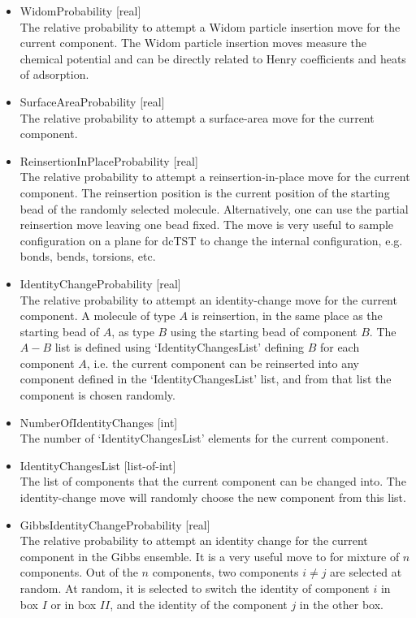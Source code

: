 \begin{itemize}
\item{WidomProbability [real]}\\
The relative probability to attempt a Widom particle insertion move for the current component. The Widom particle insertion moves measure the chemical potential
and can be directly related to Henry coefficients and heats of adsorption.
\item{SurfaceAreaProbability [real]}\\
The relative probability to attempt a surface-area move for the current component.
\item{ReinsertionInPlaceProbability [real]}\\
The relative probability to attempt a reinsertion-in-place move for the current component. The reinsertion position is the current position of the starting bead of the randomly selected
molecule. Alternatively, one can use the partial reinsertion move leaving one bead fixed. The move is very useful to sample configuration on a plane for dcTST to change
the internal configuration, e.g. bonds, bends, torsions, etc.
\item{IdentityChangeProbability [real]}\\
The relative probability to attempt an identity-change move for the current component. A molecule of type $A$ is reinsertion, in the same place as the starting bead of $A$, as type $B$ using
the starting bead of component $B$. The $A-B$ list is defined using `IdentityChangesList' defining $B$ for each component $A$, i.e. the current component can be reinserted into
any component defined in the `IdentityChangesList' list, and from that list the component is chosen randomly.
\item{NumberOfIdentityChanges [int]}\\
The number of `IdentityChangesList' elements for the current component.
\item{IdentityChangesList [list-of-int]}\\
The list of components that the current component can be changed into. The identity-change move will randomly choose the new component from this list.
\item{GibbsIdentityChangeProbability [real]}\\
The relative probability to attempt an identity change for the current component in the Gibbs ensemble.
It is a very useful move to for mixture of $n$ components. Out of the $n$ components, two components $i\not=j$ are selected at random.
At random, it is selected to switch the identity of component $i$
in box $I$ or in box $II$, and the identity of the component $j$ in the other box.

\end{itemize}
